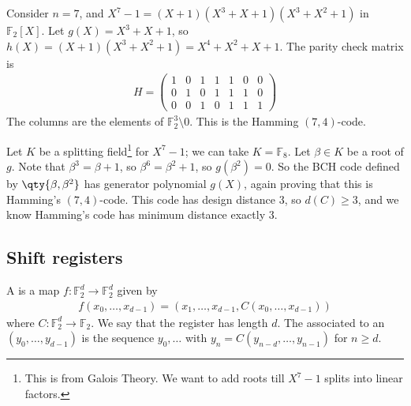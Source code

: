 \begin{example}

    Consider $n = 7$, and $X^7 - 1 = (X + 1)(X^3 + X + 1)(X^3 + X^2 + 1)$ in $\mathbb F_2[X]$.
    Let $g(X) = X^3 + X + 1$, so $h(X) = (X + 1)(X^3 + X^2 + 1) = X^4 + X^2 + X + 1$.
    The parity check matrix is
    \begin{align*}
        H = \begin{pmatrix}
            1 & 0 & 1 & 1 & 1 & 0 & 0 \\
            0 & 1 & 0 & 1 & 1 & 1 & 0 \\
            0 & 0 & 1 & 0 & 1 & 1 & 1
        \end{pmatrix}
    \end{align*}
    The columns are the elements of $\mathbb F_2^3 \setminus \qty{0}$.
    This is the Hamming $(7,4)$-code.

    Let $K$ be a splitting field\footnote{This is from Galois Theory. We want to add roots till $X^7 - 1$ splits into linear factors.} for $X^7 - 1$; we can take $K = \mathbb F_8$.
    Let $\beta \in K$ be a root of $g$.
    Note that $\beta^3 = \beta + 1$, so $\beta^6 = \beta^2 + 1$, so $g(\beta^2) = 0$. %
    So the BCH code defined by $\qty{\beta, \beta^2}$ has generator polynomial $g(X)$, again proving that this is Hamming's $(7,4)$-code.
    This code has design distance $3$, so $d(C) \geq 3$, and we know Hamming's code has minimum distance exactly 3.
\end{example}

\subsection{Shift registers}

\begin{definition}
    A  is a map $f \colon \mathbb F_2^d \to \mathbb F_2^d$ given by
    \begin{align*}
        f(x_0, \dots, x_{d-1}) = (x_1, \dots, x_{d-1}, C(x_0, \dots, x_{d-1}))
    \end{align*}
    where $C \colon \mathbb F_2^d \to \mathbb F_2$.
    We say that the register has length $d$.
    The  associated to an  $(y_0, \dots, y_{d-1})$ is the sequence $y_0, \dots$ with $y_n = C(y_{n-d}, \dots, y_{n-1})$ for $n \geq d$.
\end{definition}

